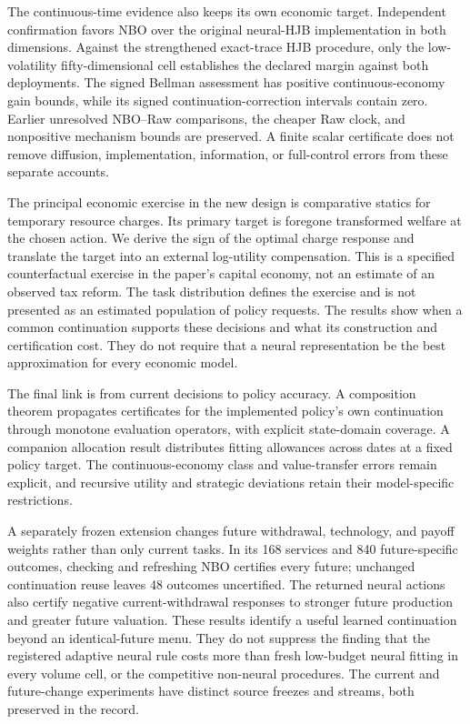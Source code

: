 The continuous-time evidence also keeps its own economic target. Independent
confirmation favors NBO over the original neural-HJB implementation in both
dimensions. Against the strengthened exact-trace HJB procedure, only the
low-volatility fifty-dimensional cell establishes the declared margin against
both deployments. The signed Bellman assessment has positive continuous-economy
gain bounds, while its signed continuation-correction intervals contain zero.
Earlier unresolved NBO--Raw comparisons, the cheaper Raw clock, and
nonpositive mechanism bounds are preserved. A finite scalar certificate does
not remove diffusion, implementation, information, or full-control errors
from these separate accounts.

The principal economic exercise in the new design is comparative statics
for temporary resource charges. Its primary target is foregone transformed
welfare at the chosen action. We derive the sign of the optimal charge
response and translate the target into an external log-utility compensation.
This is a specified counterfactual exercise in the paper's capital economy,
not an estimate of an observed tax reform. The task distribution defines the
exercise and is not presented as an estimated population of policy requests.
The results show when a common continuation supports these decisions and
what its construction and certification cost. They do not require that a
neural representation be the best approximation for every economic model.


The final link is from current decisions to policy accuracy. A composition
theorem propagates certificates for the implemented policy's own continuation
through monotone evaluation operators, with explicit state-domain coverage.
A companion allocation result distributes fitting allowances across dates
at a fixed policy target. The continuous-economy class and value-transfer
errors remain explicit, and recursive utility and strategic deviations retain
their model-specific restrictions.

A separately frozen extension changes future withdrawal, technology, and
payoff weights rather than only current tasks. In its 168 services and 840
future-specific outcomes, checking and refreshing NBO certifies every
future; unchanged continuation reuse leaves 48 outcomes uncertified. The
returned neural actions also certify negative current-withdrawal responses
to stronger future production and greater future valuation. These results
identify a useful learned continuation beyond an identical-future menu.
They do not suppress the finding that the registered adaptive neural rule
costs more than fresh low-budget neural fitting in every volume cell, or the
competitive non-neural procedures. The current and future-change experiments
have distinct source freezes and streams, both preserved in the record.

